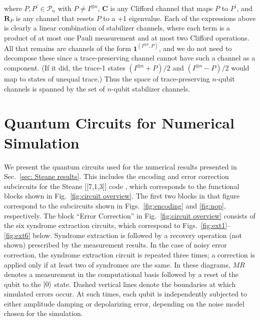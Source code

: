 \documentclass[twocolumn,pra]{revtex4}
\newcommand{\bs}[1]{\boldsymbol{#1}}
\begin{document}
where $P,P^{\prime}\in\mathcal{P}_{n}$ with $P\ne I^{\otimes n}$,
$\mathbf{C}$ is any Clifford channel that maps $P$ to $P^{\prime}$,
and $\mathbf{R}_{P}$ is any channel that resets $P$ to a +1 eigenvalue.
Each of the expressions above is clearly a linear combination of stabilizer
channels, where each term is a product of at most one Pauli measurement
and at most two Clifford operations. All that remains are channels
of the form $\bs{1}^{(I^{\otimes n},P)}$, and we do not need
to decompose these since a trace-preserving channel cannot have such a channel as a component.
(If it did, the trace-1 states $(I^{\otimes n} + P)/2$ and $(I^{\otimes n} - P)/2$ would map to states of unequal trace.)
Thus the space of trace-preserving $n$-qubit channels is spanned by the set of $n$-qubit
stabilizer channels.
\section{Quantum Circuits for Numerical Simulation} 
\label{app:circuits}
We present the quantum circuits used for the numerical results presented in Sec.~\ref{sec: Steane results}.
This includes the encoding and error correction subcircuits for the Steane [[7,1,3]] code \cite{Steane1996}, which corresponds to the functional blocks shown in Fig.~\ref{fig:circuit overview}.
The first two blocks in that figure correspond to the subcircuits shown in Figs.~\ref{fig:encoding} and \ref{fig:nop}, respectively.
The block ``Error Correction'' in  Fig.~\ref{fig:circuit overview} consists of the six syndrome extraction circuits, which correspond to Figs.~\ref{fig:ext1}--\ref{fig:ext6} below. Syndrome extraction is followed by a recovery operation (not shown) prescribed by the measurement results.
In the case of noisy error correction, the syndrome extraction circuit is repeated three times; a correction is applied only if at least two of syndromes are the same.
In these diagrams, $MR$ denotes a measurement in the computational basis followed by a reset of the qubit to the ${\left\vert{0}\right\rangle}$ state.
Dashed vertical lines denote the boundaries at which simulated errors occur.
At such times, each qubit is independently subjected to either amplitude damping or depolarizing error, depending on the noise model chosen for the simulation.
\newcommand{\qwu}{\ar@{--}[]+<0em,.45em>;[d]+<0em,.75em>}
\end{document}
